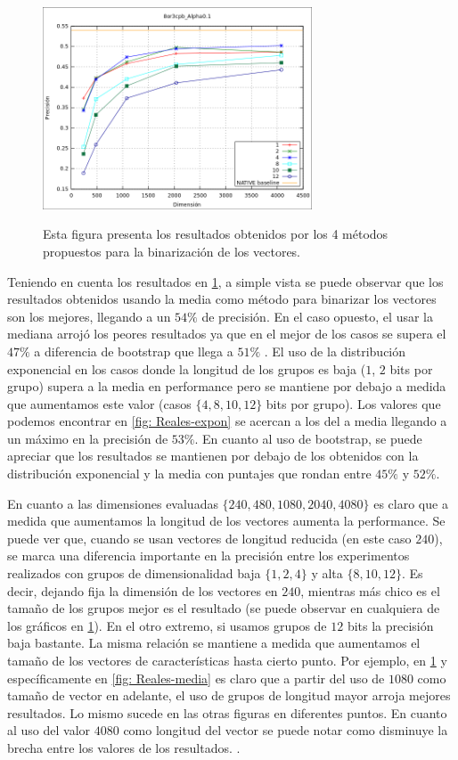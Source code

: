 \begin{figure}[htbp!]
{					\includegraphics[width=8cm]{img/resultados/reales/bootstrap.png}
				}
				\caption[Resultados-Reales]{Esta figura presenta los resultados obtenidos por los 4 métodos propuestos para la binarización de los vectores.}
				\label{fig: Resultados-Reales}
			\end{figure}
			
	Teniendo en cuenta los resultados en \ref{fig: Resultados-Reales}, a simple vista se puede observar que los resultados obtenidos usando la media como método para binarizar los vectores son los mejores, llegando a un $54\%$ de precisión. En el caso opuesto, el usar la mediana arrojó los peores resultados ya que en el mejor de los casos se supera el $47\%$ a diferencia de bootstrap que llega a $51\%$ . El uso de la distribución exponencial en los casos donde la longitud de los grupos es baja ($1$, $2$ bits por grupo) supera a la media en performance pero se mantiene por debajo a medida que aumentamos este valor (casos $\{ 4, 8, 10, 12\}$ bits por grupo). Los valores que podemos encontrar en \ref{fig: Reales-expon} se acercan a los del a media llegando a un máximo en la precisión de $53\%$. En cuanto al uso de bootstrap, se puede apreciar que los resultados se mantienen por debajo de los obtenidos con la distribución exponencial y la media con puntajes que rondan entre $45\%$ y $52\%$.
	
	En cuanto a las dimensiones evaluadas $\{ 240, 480, 1080, 2040, 4080 \}$ es claro que a medida que aumentamos la longitud de los vectores aumenta la performance. Se puede ver que, cuando se usan vectores de longitud reducida (en este caso $240$), se marca una diferencia importante en la precisión entre los experimentos realizados con grupos de dimensionalidad baja $\{ 1, 2, 4 \}$ y alta $\{8, 10, 12\}$. Es decir, dejando fija la dimensión de los vectores en $240$, mientras más chico es el tamaño de los grupos mejor es el resultado (se puede observar en cualquiera de los gráficos en \ref{fig: Resultados-Reales}). En el otro extremo, si usamos grupos de $12$ bits la precisión baja bastante. La misma relación se mantiene a medida que aumentamos el tamaño de los vectores de características hasta cierto punto. Por ejemplo, en \ref{fig: Resultados-Reales} y específicamente en \ref{fig: Reales-media} es claro que a partir del uso de $1080$ como tamaño de vector en adelante, el uso de grupos de longitud mayor arroja mejores resultados. Lo mismo sucede en las otras figuras en diferentes puntos. En cuanto al uso del valor $4080$ como longitud del vector se puede notar como disminuye la brecha entre los valores de los resultados. .
	
